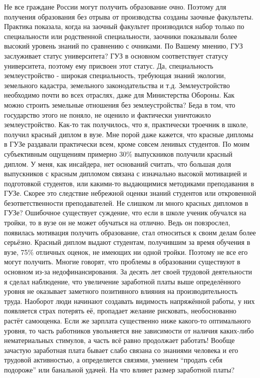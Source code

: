 \begin{drama}
	\michaelspeaks Не все граждане России могут получить образование очно. Поэтому для получения образования без отрыва от производства созданы заочные факультеты. Практика показала, когда на заочный факультет производился набор только по специальности или родственной специальности, заочники показывали более высокий уровень знаний по сравнению с очниками.
	\maxspeaks По Вашему мнению, ГУЗ заслуживает статус университета?
	\michaelspeaks ГУЗ в основном соответствует статусу университета, поэтому ему присвоен этот статус. Да, специальность землеустройство - широкая специальность, требующая знаний экологии, земельного кадастра, земельного законодательства и т.д. Землеустройство необходимо почти во всех отраслях, даже для Министерства Обороны. Как можно строить земельные отношения без землеустройства? Беда в том, что государство этого не поняло, не оценило и фактически уничтожило землеустройство.
	\maxspeaks Как-то так получилось, что я, практически троечник в школе, получил красный диплом в вузе. Мне порой даже кажется, что красные дипломы в ГУЗе раздавали практически всем, кроме совсем ленивых студентов. По моим субъективным ощущениям примерно 30\% выпускников получили красный диплом. У меня, как инсайдера, нет оснований считать, что большая доля выпускников с красным дипломом связана с изначально высокой мотивацией и подготовкой студентов, или какими-то выдающимися методиками преподавания в ГУЗе. Скорее это следствие небрежной оценки знаний студентов или откровенной безответственности преподавателей. Не слишком ли много красных дипломов в ГУЗе?  
	\michaelspeaks Ошибочное существует суждение, что если в школе ученик обучался на тройки, то в вузе он не может обучаться на отлично. Ведь он повзрослел, появилась мотивация получить образование, стал относиться к своим делам более серьёзно. Красный диплом выдают студентам, получившим за время обучения в вузе, 75\% отличных оценок, не имеющих ни одной тройки. Поэтому не все его могут получить.
	\maxspeaks Многие говорят, что проблемы в образовании существуют в основном из-за недофинансирования. За десять лет своей трудовой деятельности я сделал наблюдение, что увеличение заработной платы выше определённого уровня не оказывает заметного позитивного влияния на производительность труда. Наоборот люди начинают создавать видимость напряжённой работы, у них появляется страх потерять её, пропадает желание рисковать, необоснованно растёт самооценка. Если же зарплата существенно ниже какого-то оптимального уровня, то часть работников увольняется вне зависимости от наличия каких-либо нематериальных стимулов, а часть всё равно продолжает работать!  Вообще зачастую заработная плата бывает слабо связана со знаниями человека и его трудовой активностью, а определяется связями, умением “продать себя подороже” или банальной удачей. На что влияет размер заработной платы?

\end{drama}
